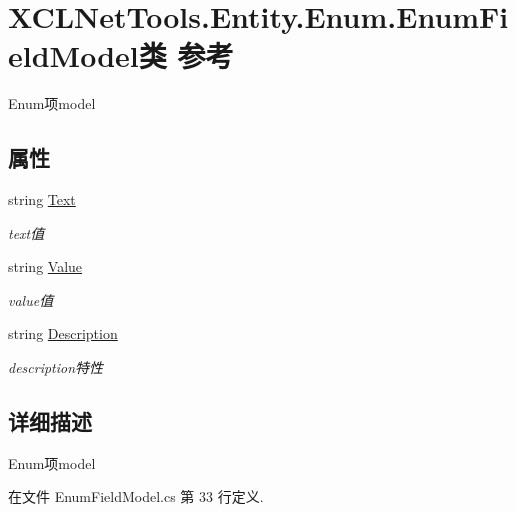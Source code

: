 \hypertarget{class_x_c_l_net_tools_1_1_entity_1_1_enum_1_1_enum_field_model}{\section{X\-C\-L\-Net\-Tools.\-Entity.\-Enum.\-Enum\-Field\-Model类 参考}
\label{class_x_c_l_net_tools_1_1_entity_1_1_enum_1_1_enum_field_model}
}


Enum项model  


\subsection*{属性}
\begin{DoxyCompactItemize}
\item 
string \hyperlink{class_x_c_l_net_tools_1_1_entity_1_1_enum_1_1_enum_field_model_afba0a6a9289087c382b5d8050ff4dcd0}{Text}
\begin{DoxyCompactList}\small\item\em text值 \end{DoxyCompactList}\item 
string \hyperlink{class_x_c_l_net_tools_1_1_entity_1_1_enum_1_1_enum_field_model_aa2c519a0507eff410068ee108e7ed845}{Value}
\begin{DoxyCompactList}\small\item\em value值 \end{DoxyCompactList}\item 
string \hyperlink{class_x_c_l_net_tools_1_1_entity_1_1_enum_1_1_enum_field_model_aac9ea6b895da17a78a261f2721a6da08}{Description}
\begin{DoxyCompactList}\small\item\em description特性 \end{DoxyCompactList}\end{DoxyCompactItemize}


\subsection{详细描述}
Enum项model 



在文件 Enum\-Field\-Model.\-cs 第 33 行定义.



